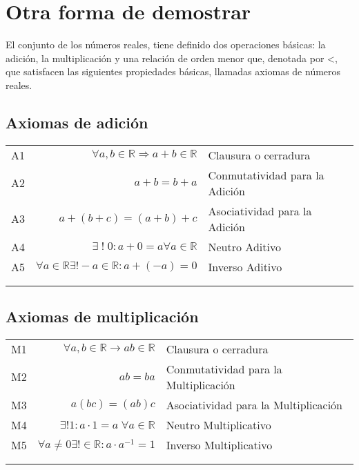 \chapter{Otra forma de demostrar}
El conjunto de los números reales, tiene definido dos operaciones básicas: la adición, la multiplicación y una relación de orden menor que, denotada por <, que satisfacen las siguientes propiedades básicas, llamadas axiomas de números reales.\\

\section{Axiomas de adición}
\begin{center}
\begin{tabular}{c r l}
A1&$\forall a,b \in \mathbb{R} \Rightarrow a+b\in \mathbb{R}$&Clausura o cerradura \\ \label{A1}
A2&$a+b=b+a$&Conmutatividad para la Adición\\ \label{A2}
A3&$a+(b+c)=(a+b)+c$&Asociatividad para la Adición\\ \label{A3}
A4&$\exists \; ! \; 0: a+0=a \forall a \in \mathbb{R} $&Neutro Aditivo\\ \label{A4}
A5&$\forall a \in \mathbb{R} \exists ! -a\in \mathbb{R}: a+ (-a)=0$&Inverso Aditivo\\\\ \label{A5}
\end{tabular}
\end{center}
\section{Axiomas de multiplicación}
\begin{center}
\begin{tabular}{c r l}
M1&$\forall a, b \in \mathbb{R} \rightarrow ab \in \mathbb{R}$&Clausura o cerradura\\ \label{M1}
M2&$ab=ba$&Conmutatividad para la Multiplicación\\ \label{M2}
M3&$a(bc)=(ab)c$&Asociatividad para la Multiplicación\\ \label{M3}
M4&$\exists ! 1 : a\cdot 1=a \; \forall a \in \mathbb{R}$&Neutro Multiplicativo\\ \label{M4}
M5&$\forall a \neq 0 \exists ! \in \mathbb{R}: a\cdot a^{-1}=1$&Inverso Multiplicativo\\\\ \label{M5}
\end{tabular}
\end{center}
